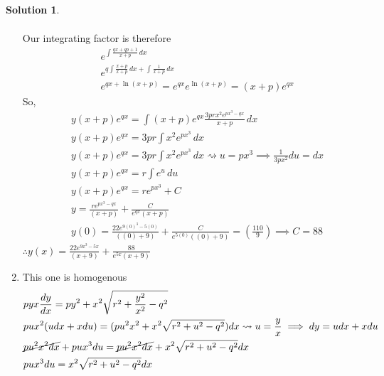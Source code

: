 \documentclass[10pt]{article}
\theoremstyle{definition}
\newtheorem{soln}{Solution}
\begin{document}
\begin{soln}
\begin{enumerate}[label=(\alph*)]
\begin{align*}
          \end{align*}
          Our integrating factor is therefore 
          \begin{align*}
             & \displaystyle e^{\int \frac{qx+qp+1}{x+p}\, dx}                      \\
             & e^{q\int \frac{x+p}{x+p}\, dx + \int\frac{1}{x+p}\, dx}              \\
             & e^{qx+\ln\left(x+p\right)}=e^{qx}e^{\ln\left(x+p\right)}=(x+p)e^{qx}
          \end{align*}
          So,
          \begin{align*}
             & y(x+p)e^{qx}=\int (x+p)e^{qx}\frac{3prx^2e^{px^3-qx}}{x+p} \, dx                                            \\
             & y(x+p)e^{qx}=3pr\int x^2e^{px^3} \, dx                                                                      \\
             & y(x+p)e^{qx}=3pr\int x^2e^{px^3} \, dx \rightsquigarrow u=px^3\implies\frac{1}{3px^2}du=dx                  \\
             & y(x+p)e^{qx}=r\int e^{u} \, du                                                                              \\
             & y(x+p)e^{qx}=re^{px^3}+C                                                                                    \\
             & y=\frac{re^{px^3-qx}}{(x+p)}+\frac{C}{e^{qx}(x+p)}                                                          \\
             & y(0)=\frac{22e^{9(0)^3-5(0)}}{((0)+9)}+\frac{C}{e^{5(0)}((0)+9)} = \left(\frac{110}{9}\right)\implies C=88
          \end{align*}
          $\therefore y(x)=\displaystyle\frac{22e^{9x^3-5x}}{(x+9)}+\frac{88}{e^{5x}(x+9)}$
    \item This one is homogenous
          \begin{align*}
             & pyx\frac{dy}{dx}=py^2+x^2\sqrt{r^2+\frac{y^2}{x^2}-q^2}                                                 \\
             & pux^2(udx+xdu)=(pu^2x^2+x^2\sqrt{r^2+u^2-q^2})dx\rightsquigarrow u=\frac{y}{x}\implies dy=udx+xdu       \\
             & \cancel{pu^2x^2dx}+pux^3du=\cancel{pu^2x^2dx}+x^2\sqrt{r^2+u^2-q^2}dx                                   \\
             & pux^3du=x^2\sqrt{r^2+u^2-q^2}dx                                                                         \\

\end{align*}
\end{enumerate}
\end{soln}
\end{document}
